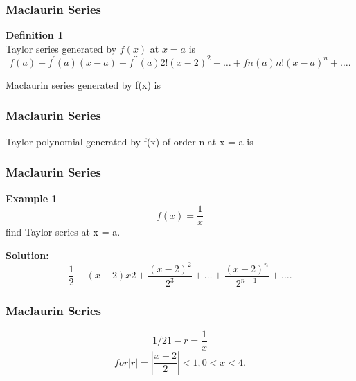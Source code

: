 \documentclass{beamer}
\begin{document}
	
	
\begin{frame}
\frametitle{Maclaurin Series}		
\textbf{Definition 1} \\ Taylor series generated by $f(x)$ at $x = a$ is
\[ f(a) + f^{\prime}(a)(x − a) +
f^{\prime\prime}(a)
2!
(x − 2)^2 + \ldots +
fn(a)
n!
(x − a)^n + \ldots .  \]


Maclaurin series generated by f(x) is

\end{frame}

\begin{frame}
\frametitle{Maclaurin Series}

Taylor polynomial generated by f(x) of order n at x = a is


\end{frame}

\begin{frame}
	\frametitle{Maclaurin Series}
\textbf{Example 1 }
\[ f(x) = \frac{1}{x}\]
find Taylor series at x = a.

\textbf{Solution:}
\[ \frac{1}{2} − (x − 2) x2 + \frac{(x − 2)^2}{2^3} + \ldots + \frac{(x - 2)^n}{2^{n+1}} + \ldots .\]
\end{frame}

\begin{frame}
	\frametitle{Maclaurin Series}

\[
1/2
1 − r
=
\frac{1}{x}
\]
\[for |r| = |\frac{x − 2}{2}|< 1, 0 < x < 4.\]
\end{frame}
\end{document}
